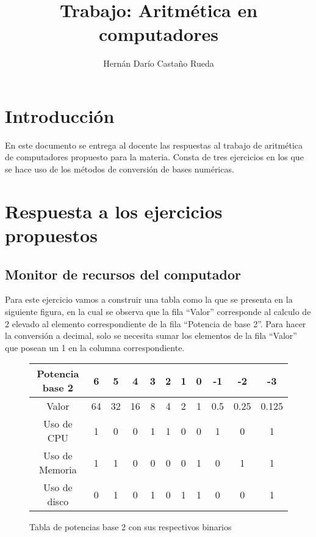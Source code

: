 \documentclass[stu, 12pt, letterpaper, donotrepeattitle, floatsintext, natbib]{apa7}
\title{\Large Trabajo: Aritmética en computadores}
\author{Hernán Darío Castaño Rueda} %
\affiliation{Fundación Universitaria Internacional de la Rioja}
\begin{document}
\maketitle


\renewcommand\contentsname{\largeÍndice}
\tableofcontents
\setcounter{tocdepth}{2}
\newpage
\renewcommand{\listfigurename}{\large Índice de fíguras}
\listoffigures
\newpage
\renewcommand{\listtablename}{\large Índice de tablas}
\listoftables
\newpage


\section{\large Introducción}
En este documento se entrega al docente las respuestas al trabajo de aritmética de computadores propuesto para la materia. Consta de tres ejercicios en los que se hace uso de los métodos de conversión de bases numéricas.

\section{\large Respuesta a los ejercicios propuestos}
\subsection{Monitor de recursos del computador}

Para este ejercicio vamos a construir una tabla como la que se presenta en la siguiente figura, en la cual se observa que la fila “Valor” corresponde al calculo de 2 elevado al elemento correspondiente de la fila “Potencia de base 2”. Para hacer la conversión a decimal, solo se necesita sumar los elementos de la fila “Valor” que posean un 1 en la columna correspondiente.

\begin{figure}
\centering
\begin{tabular}{|c|c|c|c|c|c|c|c|c|c|c|}
\hline 
Potencia base 2 & 6 & 5 & 4 & 3 & 2 & 1 & 0 & -1 & -2 & -3 \\ 
\hline 
Valor & 64 & 32 & 16 & 8 & 4 & 2 & 1 & 0.5 & 0.25 & 0.125 \\ 
\hline 
Uso de CPU & 1 & 0 & 0 & 1 & 1 & 0 & 0 & 1 & 0 & 1 \\ 
\hline 
Uso de Memoria & 1 & 1 & 0 & 0 & 0 & 0 & 1 & 0 & 1 & 1 \\ 
\hline 
Uso de disco & 0 & 1 & 0 & 1 & 0 & 1 & 1 & 0 & 0 & 1 \\ 
\hline 
\end{tabular}
\vspace{0.5cm} 
\caption{Tabla de potencias base 2 con sus respectivos binarios}
\end{figure}
\end{document}
